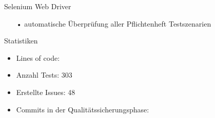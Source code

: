 \documentclass[10pt]{beamer}
\begin{document}
\begin{frame}{Selenium Web Driver}
\begin{itemize}
	\item[•] automatische Überprüfung aller Pflichtenheft Testszenarien
\end{itemize}
\end{frame}

\begin{frame}{Statistiken} %
\begin{itemize}
\item Lines of code: 
\item Anzahl Tests: 303
\item Erstellte Issues: 48
\item Commits in der Qualitätssicherungsphase:
\end{itemize}
\end{frame}
\end{document}
